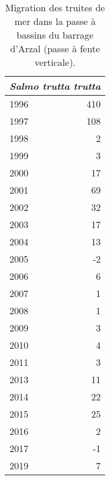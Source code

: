 \begin{table}[ht]
\centering
\begin{tabular}{lr}
  \toprule
 \multicolumn{2}{c}{\textit{Salmo trutta trutta}}  \\
 \midrule
1996 & 410 \\ 
  1997 & 108 \\ 
  1998 & 2 \\ 
  1999 & 3 \\ 
  2000 & 17 \\ 
  2001 & 69 \\ 
  2002 & 32 \\ 
  2003 & 17 \\ 
  2004 & 13 \\ 
  2005 & -2 \\ 
  2006 & 6 \\ 
  2007 & 1 \\ 
  2008 & 1 \\ 
  2009 & 3 \\ 
  2010 & 4 \\ 
  2011 & 3 \\ 
  2013 & 11 \\ 
  2014 & 22 \\ 
  2015 & 25 \\ 
  2016 & 2 \\ 
  2017 & -1 \\ 
  2019 & 7 \\ 
   \bottomrule
\end{tabular}
\caption{Migration des truites de mer dans la passe à bassins du barrage
				d'Arzal (passe à fente verticale).} 
\label{table_bilanannuel_trm}
\end{table}
